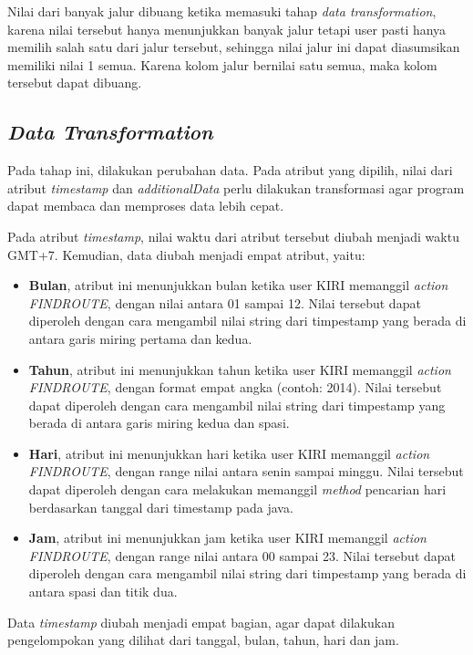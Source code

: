 Nilai dari banyak jalur dibuang ketika memasuki tahap \textsl{data transformation}, karena nilai tersebut hanya menunjukkan banyak jalur tetapi user pasti hanya memilih salah satu dari jalur tersebut, sehingga nilai jalur ini dapat diasumsikan memiliki nilai 1 semua. Karena kolom jalur bernilai satu semua, maka kolom tersebut dapat dibuang.

\subsection{\textsl{Data Transformation}}
Pada tahap ini, dilakukan perubahan data. Pada atribut yang dipilih, nilai dari atribut \textsl{timestamp} dan \textsl{additionalData} perlu dilakukan transformasi agar program dapat membaca dan memproses data lebih cepat. 

Pada atribut \textsl{timestamp}, nilai waktu dari atribut tersebut diubah menjadi waktu GMT+7. Kemudian, data diubah menjadi empat atribut, yaitu:
\begin{itemize}
	\item \textbf{Bulan}, atribut ini  menunjukkan bulan ketika user KIRI memanggil \textsl{action FINDROUTE}, dengan nilai antara 01 sampai 12. Nilai tersebut dapat diperoleh dengan cara mengambil nilai string dari timpestamp yang berada di antara garis miring pertama dan kedua.
	\item \textbf{Tahun}, atribut ini menunjukkan tahun ketika user KIRI memanggil \textsl{action FINDROUTE}, dengan format empat angka (contoh: 2014). Nilai tersebut dapat diperoleh dengan cara mengambil nilai string dari timpestamp yang berada di antara garis miring kedua dan spasi.
	\item \textbf{Hari}, atribut ini menunjukkan hari ketika user KIRI memanggil \textsl{action FINDROUTE}, dengan range nilai antara senin sampai minggu. Nilai tersebut dapat diperoleh dengan cara melakukan memanggil \textsl{method} pencarian hari berdasarkan tanggal dari timestamp pada java.
	\item \textbf{Jam}, atribut ini menunjukkan jam ketika user KIRI memanggil \textsl{action FINDROUTE}, dengan range nilai antara 00 sampai 23. Nilai tersebut dapat diperoleh dengan cara mengambil nilai string dari timpestamp yang berada di antara spasi dan titik dua.
\end{itemize}

Data \textsl{timestamp} diubah menjadi empat bagian, agar dapat dilakukan pengelompokan yang dilihat dari tanggal, bulan, tahun, hari dan jam.


